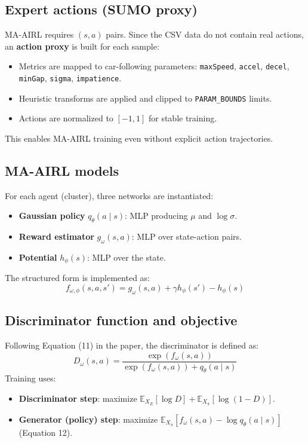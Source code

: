 \subsection{Expert actions (SUMO proxy)}
MA-AIRL requires $(s, a)$ pairs. Since the CSV data do not contain real actions, an \textbf{action proxy} is built for each sample:
\begin{itemize}
\item Metrics are mapped to car-following parameters: \texttt{maxSpeed}, \texttt{accel}, \texttt{decel}, \texttt{minGap}, \texttt{sigma}, \texttt{impatience}.
\item Heuristic transforms are applied and clipped to \texttt{PARAM\_BOUNDS} limits.
\item Actions are normalized to $[-1,1]$ for stable training.
\end{itemize}
This enables MA-AIRL training even without explicit action trajectories.

\subsection{MA-AIRL models}
For each agent (cluster), three networks are instantiated:
\begin{itemize}
\item \textbf{Gaussian policy} $q_\theta(a \mid s)$: MLP producing $\mu$ and $\log\sigma$.
\item \textbf{Reward estimator} $g_\omega(s,a)$: MLP over state-action pairs.
\item \textbf{Potential} $h_\phi(s)$: MLP over the state.
\end{itemize}
The structured form is implemented as:
\[
f_{\omega,\phi}(s,a,s') = g_\omega(s,a) + \gamma h_\phi(s') - h_\phi(s)
\]

\subsection{Discriminator function and objective}
Following Equation (11) in the paper, the discriminator is defined as:
\[
D_{\omega}(s,a)=\frac{\exp(f_{\omega}(s,a))}{\exp(f_{\omega}(s,a)) + q_\theta(a \mid s)}
\]
Training uses:
\begin{itemize}
\item \textbf{Discriminator step}: maximize $\mathbb{E}_{X_E}[\log D] + \mathbb{E}_{X_\pi}[\log(1-D)]$.
\item \textbf{Generator (policy) step}: maximize $\mathbb{E}_{X_\pi}[f_\omega(s,a) - \log q_\theta(a \mid s)]$ (Equation 12).
\end{itemize}

